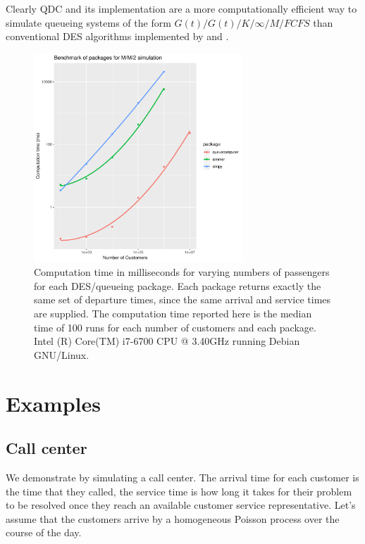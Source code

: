 \documentclass[article]{jss}
\begin{document}
Clearly QDC and its implementation  are a more computationally efficient way to simulate queueing systems of the form $G(t)/G(t)/K/\infty/M/FCFS$ than conventional DES algorithms implemented by  and . 

\begin{figure}[!htb]
  \centering
  \includegraphics[width = 0.7\textwidth]{figures/benchmark_083.pdf}
  \caption{Computation time in milliseconds for varying numbers of passengers for each DES/queueing package. Each package returns exactly the same set of departure times, since the same arrival and service times are supplied. The computation time reported here is the median time of 100 runs for each number of customers and each package. Intel (R) Core(TM) i7-6700
CPU @ 3.40GHz running Debian GNU/Linux.
 }
  \label{fig:bm_numberofpassengers}
\end{figure}

\newpage

\section{Examples} \label{sec:Examples}

\subsection{Call center} \label{ssec:callcenter}

We demonstrate  by simulating a call center. The arrival time for each customer is the time that they called, the service time is how long it takes for their problem to be resolved once they reach an available customer service representative. Let's assume that the customers arrive by a homogeneous Poisson process over the course of the day. 
\end{document}

